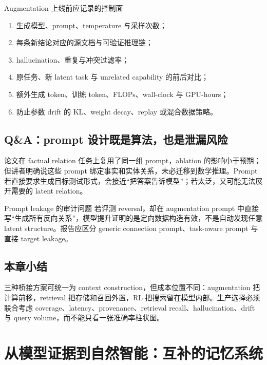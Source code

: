 \documentclass[a4paper]{article}
\begin{document}
\begin{knowledgebox}{Augmentation 上线前应记录的控制面}
\begin{enumerate}
  \item 生成模型、prompt、temperature 与采样次数；
  \item 每条新结论对应的源文档与可验证推理链；
  \item hallucination、重复与冲突过滤率；
  \item 原任务、新 latent task 与 unrelated capability 的前后对比；
  \item 额外生成 token、训练 token、FLOPs、wall-clock 与 GPU-hours；
  \item 防止参数 drift 的 KL、weight decay、replay 或混合数据策略。
\end{enumerate}
\end{knowledgebox}

\subsection{Q\&A：prompt 设计既是算法，也是泄漏风险}

论文在 factual relation 任务上复用了同一组 prompt，ablation 的影响小于预期；但讲者明确说这些 prompt 绑定事实和实体关系，未必迁移到数学推理。Prompt 若直接要求生成目标测试形式，会接近“把答案告诉模型”；若太泛，又可能无法展开需要的 latent relation。


\begin{warningbox}{Prompt leakage 的审计问题}
若评测 reversal，却在 augmentation prompt 中直接写“生成所有反向关系”，模型提升证明的是定向数据构造有效，不是自动发现任意 latent structure。报告应区分 generic connection prompt、task-aware prompt 与直接 target leakage。
\end{warningbox}

\subsection{本章小结}

三种桥接方案可统一为 context construction，但成本位置不同：augmentation 把计算前移，retrieval 把存储和召回外置，RL 把搜索留在模型内部。生产选择必须联合考虑 coverage、latency、provenance、retrieval recall、hallucination、drift 与 query volume，而不能只看一张准确率柱状图。

\section{从模型证据到自然智能：互补的记忆系统}
\end{document}
